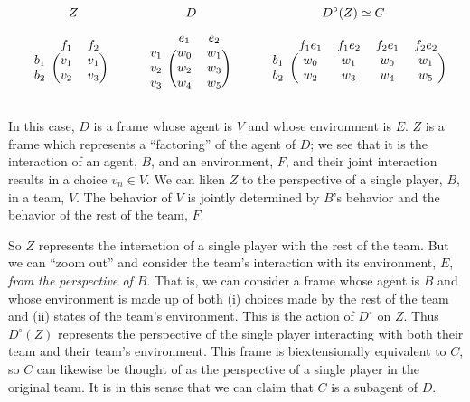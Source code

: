 \documentclass{article}
\begin{document}
\[
\hspace{-0.5cm} 
Z
\hspace{3cm}
D
\hspace{3.5cm}
D^{\circ}(Z) \simeq C
\]
\[
\begin{blockarray}{ccc}
& f_1 & f_2 \\
\begin{block}{c(cc)}
b_1 & v_1 & v_1 \\
b_2 & v_2 & v_3 \\
\end{block}
\end{blockarray}
\hspace{1cm}
\begin{blockarray}{ccc}
& e_1 & e_2 \\
\begin{block}{c(cc)}
v_1 & w_0 & w_1 \\
v_2 & w_2 & w_3 \\
v_3 & w_4 & w_5 \\
\end{block}
\end{blockarray}
\hspace{1cm}
\begin{blockarray}{ccccc}
& f_{1}e_1 & f_{1}e_2 & f_{2}e_1 & f_{2}e_2 \\
\begin{block}{c(cccc)}
b_1 & w_0 & w_1 & w_0 & w_1 \\
b_2 & w_2 & w_3 & w_4 & w_5 \\
\end{block}
\end{blockarray}
\]

\noindent In this case, $D$ is a frame whose agent is $V$ and whose environment is $E$.
$Z$ is a frame which represents a ``factoring'' of the agent of $D$;
we see that it is the interaction of an agent, $B$, and an environment, $F$, and their joint interaction results in a choice $v_n \in V$.
We can liken $Z$ to the perspective of a single player, $B$, in a team, $V$.
The behavior of $V$ is jointly determined by $B$'s behavior and the behavior of the rest of the team, $F$.

So $Z$ represents the interaction of a single player with the rest of the team.
But we can ``zoom out'' and consider the team's interaction with its environment, $E$, \emph{from the perspective of $B$}.
That is, we can consider a frame whose agent is $B$ and whose environment is made up of both (i) choices made by the rest of the team and (ii) states of the team's environment.
This is the action of $D^{\circ}$ on $Z$.
Thus $D^{\circ}(Z)$ represents the perspective of the single player interacting with both their team and their team's environment. This frame is biextensionally equivalent to $C$, so $C$ can likewise be thought of as the perspective of a single player in the original team.
It is in this sense that we can claim that $C$ is a subagent of $D$.
\end{document}
